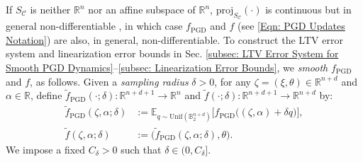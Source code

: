 \documentclass[letterpaper, 10 pt, conference]{ieeeconf}
\newcommand{\E}{\mathbb{E}}
\newcommand{\ra}{\rightarrow}
\newcommand{\R}{\mathbb{R}}
\newcommand{\?}{\stackrel{?}{=}}
\newcommand{\param}{\theta}
\newcommand{\paramDim}{d}
\newcommand{\var}{\xi}
\newcommand{\varDim}{n}
\newcommand{\ballUnit}{\mathbb{B}}
\newcommand{\ratePGD}{\alpha}
\newcommand{\dynamicsPGD}{f_{\text{PGD}}}
\newcommand{\proj}{\text{proj}}
\newcommand{\constraintSet}{{S_{\mathcal{C}}}}
\newcommand{\state}{\zeta}
\newcommand{\dynamicsFullState}{f}
\newcommand{\samplingRadius}{\delta}
\newcommand{\samplingRadiusMax}{C_\samplingRadius}
\newcommand{\samplingVariable}{q}
\newcommand{\dynamicsPGDSmoothed}{\tilde{f}_{\text{PGD}}}
\newcommand{\dynamicsFullStateSmoothed}{{\tilde{\dynamicsFullState}}}
\newcommand{\unif}{\text{Unif}}
\newcommand{\frank}[1]{{\textcolor[rgb]{0,0,1}{\textsf{[Frank: {#1}]}}}}
\newcommand{\antoine}[1]{{\textcolor[rgb]{1,0,0}{\textsf{[Antoine: {#1}]}}}}
\newcommand{\brendan}[1]{{\textcolor[rgb]{1,0,1}{\textsf{[Brendan: {#1}]}}}}
\begin{document}

If $\constraintSet$ is neither $\R^\varDim$ nor an affine subspace of $\R^\varDim$, $\proj_\constraintSet(\cdot)$ is continuous but in general non-differentiable \cite[Ex. 7.4-7.5]{WrightRecht2022OptimizationForDataAnalysis},
in which case
$\dynamicsPGD$ and $\dynamicsFullState$ (see \eqref{Eqn: PGD Updates Notation}) are also, in general, non-differentiable. 
To 
construct
the LTV error system and linearization error bounds in Sec. \ref{subsec: LTV Error System for Smooth PGD Dynamics}--\ref{subsec: Linearization Error Bounds}, we \textit{smooth} $\dynamicsPGD$ and $\dynamicsFullState$, as follows.
Given a \textit{sampling radius} $\samplingRadius > 0$, for 
any
$\state = (\var, \param) \in \R^{\varDim + \paramDim}$ and 
$\ratePGD \in \R$, define $\dynamicsPGDSmoothed(\cdot; \samplingRadius): \R^{\varDim + \paramDim + 1} \ra \R^{\varDim} $ and $\dynamicsFullStateSmoothed(\cdot; \samplingRadius): \R^{\varDim + \paramDim + 1} \ra \R^{\varDim + \paramDim} $ by:
{
\setlength{\abovedisplayskip}{3.5pt}
\setlength{\belowdisplayskip}{3.5pt}
\begin{align}
    \label{Eqn: True Dynamics, Smoothed}
    \dynamicsPGDSmoothed(\state, \ratePGD; \samplingRadius) &:= \E_{\samplingVariable \sim \unif(\ballUnit_2^{\varDim + \paramDim})} \big[ \dynamicsPGD\big( (\state, \ratePGD) + \samplingRadius \samplingVariable \big) \big], \\
    \label{Eqn: Full State Dynamics, Smoothed}
    \dynamicsFullStateSmoothed(\state, \ratePGD; \samplingRadius) &:= \big( \dynamicsPGDSmoothed(\state, \ratePGD; \samplingRadius), \param \big).
\end{align}
}
We impose a fixed $\samplingRadiusMax > 0$ such that $\samplingRadius \in (0, \samplingRadiusMax]$. 
\end{document}
